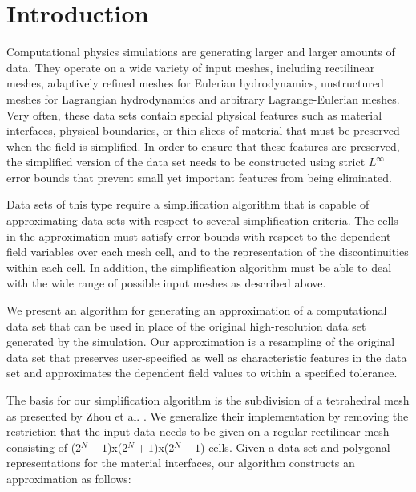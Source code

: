 \documentclass{siggraph}
\begin{document}
\section{Introduction}

Computational physics simulations are generating larger and larger
amounts of data.  They operate on a wide variety of input meshes,
including rectilinear meshes, adaptively refined meshes for Eulerian
hydrodynamics, unstructured meshes for Lagrangian hydrodynamics and
arbitrary Lagrange-Eulerian meshes.  Very often, these data sets
contain special physical features such as material interfaces,
physical boundaries, or thin slices of material that must be preserved
when the field is simplified.  In order to ensure that these features
are preserved, the simplified version of the data set needs to be
constructed using strict $L^{\infty}$ error bounds that prevent small
yet important features from being eliminated.


Data sets of this type require a simplification algorithm that is
capable of approximating data sets with respect to several
simplification criteria.   The cells in the approximation must satisfy
error bounds with respect to the dependent field variables over each
mesh cell, and to the representation of the discontinuities within
each cell.  In addition, the simplification algorithm must be able to
deal with the wide range of possible input meshes as described above.


We present an algorithm for generating an approximation of a
computational data set that can be used in place of the original
high-resolution data set generated by the simulation.
Our approximation is a resampling of the original data set that
preserves user-specified as well as characteristic features in the
data set and approximates the dependent field values to within a
specified tolerance.


The basis for our simplification algorithm is the subdivision of a
tetrahedral mesh as presented by Zhou et al. \cite{Zhou:1997:MTF}.  We
generalize their implementation by removing the restriction that the
input data needs to be given on a regular rectilinear mesh consisting
of (2$^{N}+1$)x(2$^{N}+1$)x(2$^{N}+1$) cells.   Given a data set and
polygonal representations for the material interfaces, our algorithm
constructs an approximation as follows:
\end{document}
